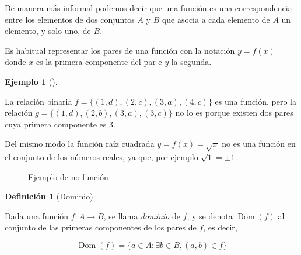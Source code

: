 \documentclass[
  a4paper,
]{scrreport}
\theoremstyle{definition}
\newtheorem{example}{Ejemplo}[chapter]
\theoremstyle{plain}
\theoremstyle{plain}
\theoremstyle{definition}
\newtheorem{definition}{Definición}[chapter]
\theoremstyle{plain}
\theoremstyle{remark}
\begin{document}
De manera más informal podemos decir que una función es una
correspondencia entre los elementos de dos conjuntos \(A\) y \(B\) que
asocia a cada elemento de \(A\) un elemento, y solo uno, de \(B\).

Es habitual representar los pares de una función con la notación
\(y=f(x)\) donde \(x\) es la primera componente del par e \(y\) la
segunda.

\begin{example}[]\protect\hypertarget{exm-funcion}{}\label{exm-funcion}

La relación binaria \(f=\{(1,d), (2,c), (3,a), (4,c)\}\) es una función,
pero la relación \(g=\{(1,d), (2,b), (3,a), (3,c)\}\) no lo es porque
existen dos pares cuya primera componente es \(3\).

Del mismo modo la función raíz cuadrada \(y=f(x)=\sqrt{x}\) no es una
función en el conjunto de los números reales, ya que, por ejemplo
\(\sqrt{1}=\pm 1\).

\end{example}

\begin{figure}

\begin{minipage}[t]{0.50\linewidth}

{\centering 

\raisebox{-\height}{



}

\caption{Ejemplo de función}

}

\end{minipage}%
%
\begin{minipage}[t]{0.50\linewidth}

{\centering 

\raisebox{-\height}{



}

\caption{Ejemplo de no función}

}

\end{minipage}%

\end{figure}

\begin{definition}[Dominio]\protect\hypertarget{def-dominio-funcion}{}\label{def-dominio-funcion}

Dada una función \(f:A\rightarrow B\), se llama \emph{dominio} de \(f\),
y se denota \(\operatorname{Dom}(f)\) al conjunto de las primeras
componentes de los pares de \(f\), es decir,

\[\operatorname{Dom}(f) = \{a\in A: \exists b\in B, (a,b)\in f\}\]

\end{definition}
\end{document}
